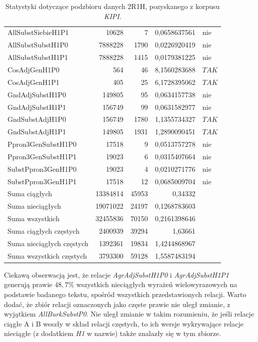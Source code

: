 \documentclass[11pt,a4paper]{llncs}
\begin{document}
\begin{table}[h!]
\begin{tabular}{ l | r | r | r | l }
	AllSubstSiebieH1P1	&	10628	&	7	&	0,0658637561	&	nie	\\
	AllSubstSubstH1P0	&	7888228	&	1790	&	0,0226920419	&	nie	\\
	AllSubstSubstH1P1	&	7888228	&	1415	&	0,0179381225	&	nie	\\
	CosAdjGenH1P0	&	564	&	46	&	8,1560283688	&	$ TAK $	\\
	CosAdjGenH1P1	&	405	&	25	&	6,1728395062	&	$ TAK $	\\
	GndAdjSubstH1P0	&	149805	&	95	&	0,0634157738	&	nie	\\
	GndAdjSubstH1P1	&	156749	&	99	&	0,0631582977	&	nie	\\
	GndSubstAdjH1P0	&	156749	&	1780	&	1,1355734327	&	$ TAK $	\\
	GndSubstAdjH1P1	&	149805	&	1931	&	1,2890090451	&	$ TAK $	\\
	Ppron3GenSubstH1P0	&	17518	&	9	&	0,0513757278	&	nie	\\
	Ppron3GenSubstH1P1	&	19023	&	6	&	0,0315407664	&	nie	\\
	SubstPpron3GenH1P0	&	19023	&	4	&	0,0210271776	&	nie	\\
	SubstPpron3GenH1P1	&	17518	&	12	&	0,0685009704	&	nie	\\
	\midrule									
	Suma ciągłych	&	13384814	&	45953	&	0,34332	&		\\
	Suma nieciągłych	&	19071022	&	24197	&	0,1268783603	&		\\
	Suma wszystkich	&	32455836	&	70150	&	0,2161398646	&		\\
	Suma ciągłych częstych	&	2400939	&	39294	&	1,63661	&		\\
	Suma nieciągłych częstych	&	1392361	&	19834	&	1,4244868967	&		\\
	Suma wszystkich częstych	&	3793300	&	59128	&	1,5587483194	&		\\
	\bottomrule
\end{tabular}
\caption[Statystyki podzbioru danych \emph{KIPI} 2R1H]{Statystyki dotyczące podzbioru danych 2R1H, pozyskanego z korpusu \emph{KIPI}.}
\label{KIPI_2R1H_stats}
\end{table}

\par
Ciekawą obserwacją jest, że relacje \emph{AgrAdjSubstH1P0} i \emph{AgrAdjSubstH1P1} generują prawie $ 48,7\% $ wszystkich nieciągłych wyrażeń wielowyrazowych na podstawie badanego tekstu, spośród wszystkich przedstawionych relacji.
Warto dodać, że zbiór relacji oznaczonych jako częste prawie nie uległ zmianie, z wyjątkiem \emph{AllBurkSubstP0}.
Nie uległ zmianie w takim rozumieniu, że jeśli relacje ciągłe A i B weszły w skład relacji częstych, to ich wersje wykrywające relacje nieciągłe (z dodatkiem \emph{H1} w nazwie) także znalazły się w tym zbiorze.
\end{document}
